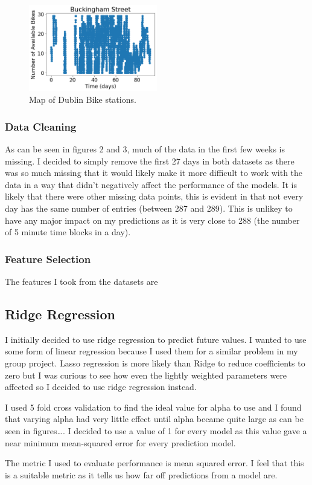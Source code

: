 \begin{figure}[H]
    \centering
    \includegraphics[width=0.5\textwidth]{images/buckingham data.png}
    \caption{Map of Dublin Bike stations.}
    \end{figure}

\subsubsection{Data Cleaning}
As can be seen in figures 2 and 3, much of the data in the first few weeks is missing.
I decided to simply remove the first 27 days in both datasets as 
there was so much missing that it would likely make it more difficult to 
work with the data in a way that didn't negatively affect the performance of the models.
It is likely that there were other missing data points, this is evident in that not every day has the same number of entries (between 287 and 289).
This is unlikey to have any major impact on my predictions as it is very close to 288
(the number of 5 minute time blocks in a day).

\subsubsection{Feature Selection}
The features I took from the datasets are 

\par 


\subsection{Ridge Regression}
I initially decided to use ridge regression to predict future values. 
I wanted to use some form of linear regression because I used them for a similar problem in my group project.
Lasso regression is more likely than Ridge to reduce coefficients to zero but I was curious to see how even the lightly weighted parameters were affected so I decided to use ridge regression instead.
\par 

I used 5 fold cross validation to find the ideal value for alpha to use and I found that varying alpha had very little effect until alpha became quite large 
as can be seen in figures\dots. 
I decided to use a value of 1 for every model as this value gave a near minimum mean-squared error for every prediction model.
\par 
The metric I used to evaluate performance is mean squared error. 
I feel that this is a suitable metric as it tells us how far off predictions from a model are. 

